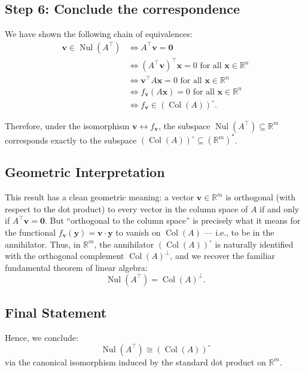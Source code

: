 \documentclass[11pt]{article}
\newcommand{\nul}{\operatorname{Nul}}
\newcommand{\col}{\operatorname{Col}}
\newcommand{\R}{\mathbb{R}}
\begin{document}
\subsection*{Step 6: Conclude the correspondence}

We have shown the following chain of equivalences:
\begin{align*}
\mathbf{v} \in \nul(A^\top) 
&\iff A^\top \mathbf{v} = \mathbf{0} \\
&\iff (A^\top \mathbf{v})^\top \mathbf{x} = 0 \text{ for all } \mathbf{x} \in \R^n \\
&\iff \mathbf{v}^\top A \mathbf{x} = 0 \text{ for all } \mathbf{x} \in \R^n \\
&\iff f_{\mathbf{v}}(A\mathbf{x}) = 0 \text{ for all } \mathbf{x} \in \R^n \\
&\iff f_{\mathbf{v}} \in (\col(A))^\circ.
\end{align*}

Therefore, under the isomorphism $\mathbf{v} \leftrightarrow f_{\mathbf{v}}$, the subspace $\nul(A^\top) \subseteq \R^m$ corresponds exactly to the subspace $(\col(A))^\circ \subseteq (\R^m)^*$.

\subsection*{Geometric Interpretation}

This result has a clean geometric meaning:  
a vector $\mathbf{v} \in \R^m$ is orthogonal (with respect to the dot product) to every vector in the column space of $A$ if and only if $A^\top \mathbf{v} = \mathbf{0}$.  
But ``orthogonal to the column space'' is precisely what it means for the functional $f_{\mathbf{v}}(\mathbf{y}) = \mathbf{v} \cdot \mathbf{y}$ to vanish on $\col(A)$ — i.e., to be in the annihilator.  
Thus, in $\R^m$, the annihilator $(\col(A))^\circ$ is naturally identified with the orthogonal complement $\col(A)^\perp$, and we recover the familiar fundamental theorem of linear algebra:
\[
\nul(A^\top) = \col(A)^\perp.
\]

\subsection*{Final Statement}

Hence, we conclude:
\[
\boxed{\nul(A^\top) \cong (\col(A))^\circ}
\]
via the canonical isomorphism induced by the standard dot product on $\R^m$.
\end{document}
